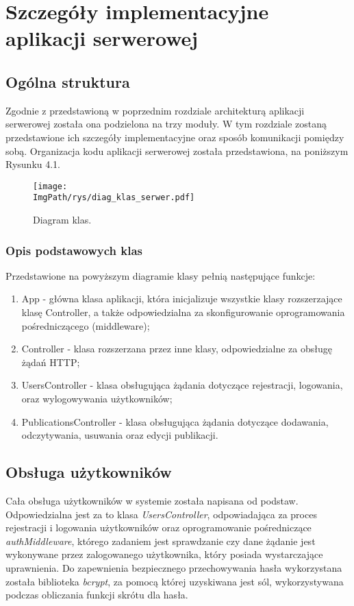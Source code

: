 \documentclass[a4paper,12pt,twoside,openany]{report}
\newcommand{\ImgPath}{.}
\begin{document}
\chapter{Szczegóły implementacyjne aplikacji serwerowej}
\section{Ogólna struktura}
Zgodnie z przedstawioną w poprzednim rozdziale architekturą aplikacji serwerowej została ona podzielona na trzy moduły. W tym rozdziale zostaną przedstawione ich szczegóły implementacyjne oraz sposób komunikacji pomiędzy sobą. Organizacja kodu aplikacji serwerowej została przedstawiona, na poniższym Rysunku 4.1.

 \begin{figure}[!htbp]
	\begin{center}
		\centering
		\texttt{[image: \\ImgPath/rys/diag\_klas\_serwer.pdf]}
	\end{center}
	\caption{Diagram klas.}
	\label{diagramKlas}
\end{figure}
\subsection{Opis podstawowych klas}
Przedstawione na powyższym diagramie klasy pełnią następujące funkcje:
\begin{enumerate}
	\item App - główna klasa aplikacji, która inicjalizuje wszystkie klasy rozszerzające klasę Controller, a także odpowiedzialna za skonfigurowanie oprogramowania pośredniczącego (middleware);
	
	\item Controller - klasa rozszerzana przez inne klasy, odpowiedzialne za obsługę żądań  HTTP;
	
	\item UsersController - klasa obsługująca żądania dotyczące rejestracji, logowania, oraz wylogowywania użytkowników;
	
	\item PublicationsController - klasa obsługująca żądania dotyczące dodawania, odczytywania, usuwania oraz edycji publikacji.
	
\end{enumerate}

\section{Obsługa użytkowników}
Cała obsługa użytkowników w systemie została napisana od podstaw. Odpowiedzialna jest za to klasa \textit{UsersController}, odpowiadająca za proces rejestracji i logowania użytkowników oraz oprogramowanie pośredniczące \textit{authMiddleware}, którego zadaniem jest sprawdzanie czy dane żądanie jest wykonywane przez zalogowanego użytkownika, który posiada wystarczające uprawnienia. Do zapewnienia bezpiecznego przechowywania hasła wykorzystana została biblioteka \textit{bcrypt}, za pomocą której uzyskiwana jest sól, wykorzystywana podczas obliczania funkcji skrótu dla hasła. 
\end{document}

